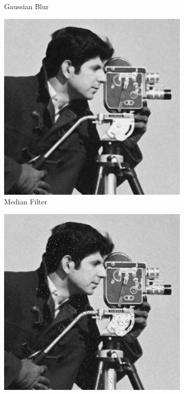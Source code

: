 \documentclass{article}\raggedbottom
\begin{document}
\begin{figure}[H]
\begin{subfigure}[b]{0.45\linewidth}
		\caption{Gaussian Blur}
	\end{subfigure}
	\begin{subfigure}[b]{0.45\linewidth}
		\includegraphics[width=\linewidth]{../../2_Software/data/median_g.png}
		\caption{Median Filter}
	\end{subfigure}
	\begin{subfigure}[b]{0.45\linewidth}
		\includegraphics[width=\linewidth]{../../2_Software/data/bilateral_g.png}

\end{subfigure}
\end{figure}
\end{document}
